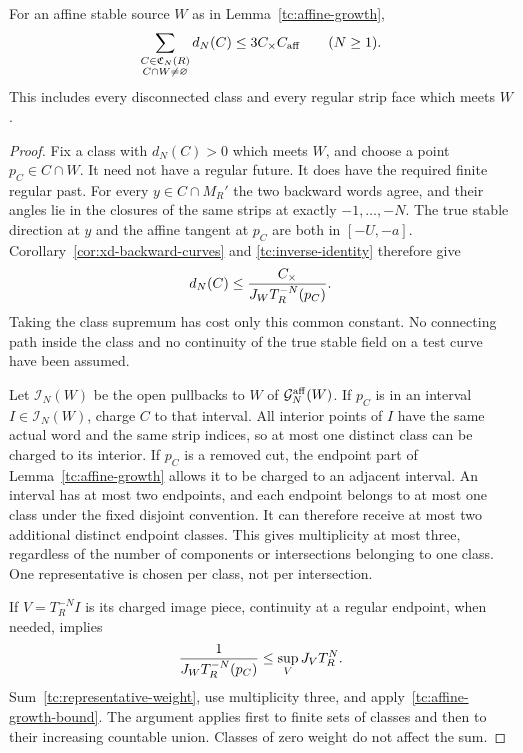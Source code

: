 \begin{lemma}
\label{tc:one-test}
For an affine stable source $W$ as in Lemma~\ref{tc:affine-growth},
\begin{equation}\label{tc:one-test-bound}
 \sum_{\substack{C\in\mathfrak C_N(R)\\ C\cap W\ne\varnothing}}
                         d_N(C)\le3C_\times C_{\rm aff}
                         \qquad(N\ge1).
\end{equation}
This includes every disconnected class and every regular strip face
which meets $W$.
\end{lemma}

\begin{proof}
Fix a class with $d_N(C)>0$ which meets $W$, and choose a point
$p_C\in C\cap W$.  It need not have a regular future.  It does
have the required finite regular past.  For every $y\in C\cap M_R'$
the two backward words agree, and their angles lie in the closures
of the same strips at exactly $-1,\ldots,-N$.  The true stable
direction at $y$ and the affine tangent at $p_C$ are both in
$[-U,-a]$.  Corollary~\ref{cor:xd-backward-curves} and
\eqref{tc:inverse-identity} therefore give
\begin{equation}\label{tc:representative-weight}
 d_N(C)\le {C_\times\over J_WT_R^{-N}(p_C)}.
\end{equation}
Taking the class supremum has cost only this common constant.
No connecting path inside the class and no continuity of the true
stable field on a test curve have been assumed.

Let $\mathcal I_N(W)$ be the open pullbacks to $W$ of
$\mathcal G_N^{\rm aff}(W)$.  If $p_C$ is in an interval
$I\in\mathcal I_N(W)$, charge $C$ to that interval.  All interior
points of $I$ have the same actual word and the same strip indices,
so at most one distinct class can be charged to its interior.
If $p_C$ is a removed cut, the endpoint part of
Lemma~\ref{tc:affine-growth} allows it to be charged to an adjacent
interval.  An interval has at most two endpoints, and each endpoint
belongs to at most one class under the fixed disjoint convention.
It can therefore receive at most two additional distinct endpoint
classes.  This gives multiplicity at most three, regardless of the
number of components or intersections belonging to one class.
One representative is chosen per class, not per intersection.

If $V=T_R^{-N}I$ is its charged image piece, continuity at a
regular endpoint, when needed, implies
\[
 {1\over J_WT_R^{-N}(p_C)}\le\sup_V J_VT_R^N.
\]
Sum~\eqref{tc:representative-weight}, use multiplicity three,
and apply~\eqref{tc:affine-growth-bound}.  The argument applies
first to finite sets of classes and then to their increasing
countable union.  Classes of zero weight do not affect the sum.
\end{proof}

